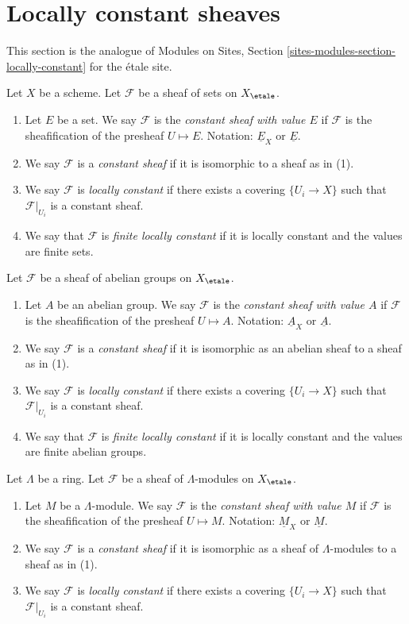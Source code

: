 \section{Locally constant sheaves}
\label{section-locally-constant}

\noindent
This section is the analogue of
Modules on Sites, Section \ref{sites-modules-section-locally-constant}
for the \'etale site.

\begin{definition}
\label{definition-finite-locally-constant}
Let $X$ be a scheme.
Let $\mathcal{F}$ be a sheaf of sets on $X_\etale$.
\begin{enumerate}
\item Let $E$ be a set. We say $\mathcal{F}$ is the
{\it constant sheaf with value $E$} if $\mathcal{F}$ is the
sheafification of the presheaf $U \mapsto E$.
Notation: $\underline{E}_X$ or $\underline{E}$.
\item We say $\mathcal{F}$ is a {\it constant sheaf} if it is
isomorphic to a sheaf as in (1).
\item We say $\mathcal{F}$ is {\it locally constant} if there exists a
covering $\{U_i \to X\}$ such that $\mathcal{F}|_{U_i}$ is a constant sheaf.
\item We say that $\mathcal{F}$ is {\it finite locally constant} if it
is locally constant and the values are finite sets.
\end{enumerate}
Let $\mathcal{F}$ be a sheaf of abelian groups on $X_\etale$.
\begin{enumerate}
\item Let $A$ be an abelian group.
We say $\mathcal{F}$ is the {\it constant sheaf with value $A$} if
$\mathcal{F}$ is the sheafification of the presheaf $U \mapsto A$.
Notation: $\underline{A}_X$ or $\underline{A}$.
\item We say $\mathcal{F}$ is a {\it constant sheaf} if it is isomorphic
as an abelian sheaf to a sheaf as in (1).
\item We say $\mathcal{F}$ is {\it locally constant} if there exists a
covering $\{U_i \to X\}$ such that $\mathcal{F}|_{U_i}$ is a constant sheaf.
\item We say that $\mathcal{F}$ is {\it finite locally constant} if it
is locally constant and the values are finite abelian groups.
\end{enumerate}
Let $\Lambda$ be a ring. Let $\mathcal{F}$ be a sheaf of $\Lambda$-modules
on $X_\etale$.
\begin{enumerate}
\item Let $M$ be a $\Lambda$-module.
We say $\mathcal{F}$ is the {\it constant sheaf with value $M$} if
$\mathcal{F}$ is the sheafification of the presheaf $U \mapsto M$.
Notation: $\underline{M}_X$ or $\underline{M}$.
\item We say $\mathcal{F}$ is a {\it constant sheaf} if it is isomorphic
as a sheaf of $\Lambda$-modules to a sheaf as in (1).
\item We say $\mathcal{F}$ is {\it locally constant} if there exists a
covering $\{U_i \to X\}$ such that $\mathcal{F}|_{U_i}$ is a constant sheaf.
\end{enumerate}
\end{definition}

